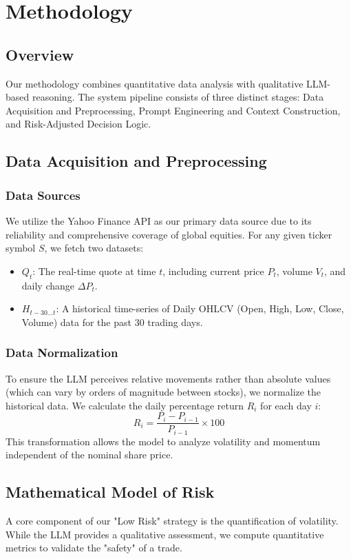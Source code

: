 \section{Methodology}

\subsection{Overview}
Our methodology combines quantitative data analysis with qualitative LLM-based reasoning. The system pipeline consists of three distinct stages: Data Acquisition and Preprocessing, Prompt Engineering and Context Construction, and Risk-Adjusted Decision Logic.

\subsection{Data Acquisition and Preprocessing}
\subsubsection{Data Sources}
We utilize the Yahoo Finance API as our primary data source due to its reliability and comprehensive coverage of global equities. For any given ticker symbol $S$, we fetch two datasets:
\begin{itemize}
    \item $Q_t$: The real-time quote at time $t$, including current price $P_t$, volume $V_t$, and daily change $\Delta P_t$.
    \item $H_{t-30 \dots t}$: A historical time-series of Daily OHLCV (Open, High, Low, Close, Volume) data for the past 30 trading days.
\end{itemize}

\subsubsection{Data Normalization}
To ensure the LLM perceives relative movements rather than absolute values (which can vary by orders of magnitude between stocks), we normalize the historical data. We calculate the daily percentage return $R_i$ for each day $i$:
\begin{equation}
    R_i = \frac{P_i - P_{i-1}}{P_{i-1}} \times 100
\end{equation}
This transformation allows the model to analyze volatility and momentum independent of the nominal share price.

\subsection{Mathematical Model of Risk}
A core component of our "Low Risk" strategy is the quantification of volatility. While the LLM provides a qualitative assessment, we compute quantitative metrics to validate the "safety" of a trade.

